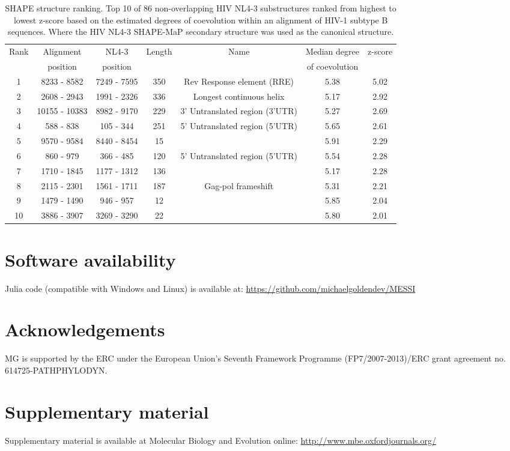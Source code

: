 \documentclass[nogrid]{MBE}%
\begin{document}
\begin{table*}
	\captionsetup{justification=centering}
	\caption{\label{tab:rankingshape} SHAPE structure ranking. Top 10 of 86 non-overlapping HIV NL4-3 substructures ranked from highest to lowest z-score based on the estimated degrees of coevolution within an alignment of HIV-1 subtype B sequences. Where the HIV NL4-3 SHAPE-MaP secondary structure was used as the canonical structure.}	
	\begin{tabularx}{1.0\linewidth}{ccccccc}
	\toprule
	Rank & Alignment & NL4-3  & Length & Name & Median degree & z-score\\
	& position & position &  &  & of coevolution &\\
	\midrule
	\rowcolor{black!20} 1 & 8233 - 8582 & 7249 - 7595 & 350 & Rev Response element (RRE) & 5.38 & 5.02\tabularnewline
	2 & 2608 - 2943 & 1991 - 2326 & 336 & Longest continuous helix & 5.17 & 2.92\tabularnewline
	\rowcolor{black!20} 3 & 10155 - 10383 & 8982 - 9170 & 229 & 3' Untranslated region (3'UTR) & 5.27 & 2.69\tabularnewline
	4 & 588 - 838 & 105 - 344 & 251 & 5' Untranslated region (5'UTR) & 5.65 & 2.61\tabularnewline
	\rowcolor{black!20} 5 & 9570 - 9584 & 8440 - 8454 & 15 &  & 5.91 & 2.29\tabularnewline
	6 & 860 - 979 & 366 - 485 & 120 & 5' Untranslated region (5'UTR) & 5.54 & 2.28\tabularnewline
	\rowcolor{black!20} 7 & 1710 - 1845 & 1177 - 1312 & 136 &  & 5.17 & 2.28\tabularnewline
	8 & 2115 - 2301 & 1561 - 1711 & 187 & Gag-pol frameshift & 5.31 & 2.21\tabularnewline
	\rowcolor{black!20} 9 & 1479 - 1490 & 946 - 957 & 12 &  & 5.85 & 2.04\tabularnewline
	10 & 3886 - 3907 & 3269 - 3290 & 22 &  & 5.80 & 2.01\tabularnewline
	\bottomrule
	\end{tabularx}
\end{table*}

\section{Software availability}
Julia code (compatible with Windows and Linux) is available at: \href{https://github.com/michaelgoldendev/MESSI}{https://github.com/michaelgoldendev/MESSI}

\section{Acknowledgements}
MG is supported by the ERC under the European Union’s Seventh Framework Programme (FP7/2007-2013)/ERC grant agreement no. 614725-PATHPHYLODYN. 

\ifmbeformat
\section{Supplementary material}
Supplementary material is available  at Molecular Biology and Evolution
online: \url{http://www.mbe.oxfordjournals.org/}
\fi

\end{document}
